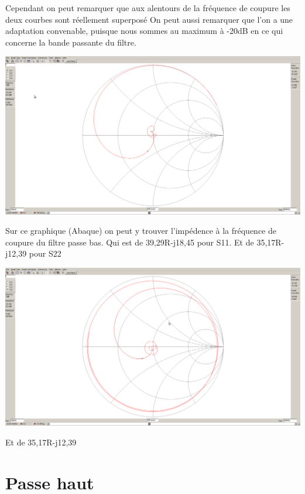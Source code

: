 \documentclass[a4paper,12pt]{report}            %
\begin{document}
Cependant on peut remarquer que aux alentours de la fréquence de coupure les deux courbes sont réellement superposé
On peut aussi remarquer que l'on a une adaptation convenable, puisque nous sommes au maximum à -20dB en
ce qui concerne la bande passante du filtre.
\begin{center}\includegraphics[scale = 0.25]{pic/Abaque_pb.png}\\ \end{center}
Sur ce graphique (Abaque) on peut y trouver l'impédence à la fréquence de coupure du filtre passe bas.
Qui est de 39,29R-j18,45 pour S11. Et de 35,17R-j12,39 pour S22
\begin{center}\includegraphics[scale = 0.25]{pic/Abaque_pbS22.png}\\ \end{center}
Et de 35,17R-j12,39

\section{Passe haut}
\end{document}
